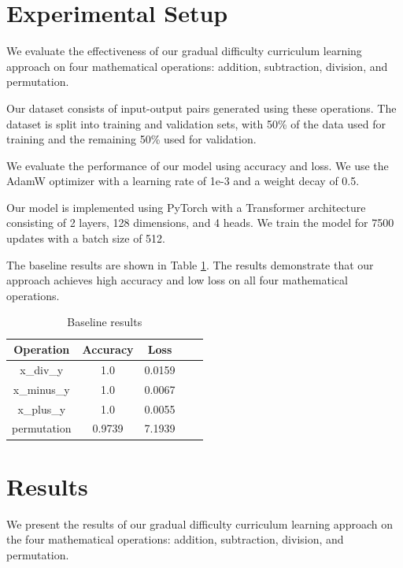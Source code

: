 \documentclass{article} %
\begin{document}
\section{Experimental Setup}
\label{sec:experimental}

We evaluate the effectiveness of our gradual difficulty curriculum learning approach on four mathematical operations: addition, subtraction, division, and permutation.

Our dataset consists of input-output pairs generated using these operations. The dataset is split into training and validation sets, with 50\% of the data used for training and the remaining 50\% used for validation.

We evaluate the performance of our model using accuracy and loss. We use the AdamW optimizer \citep{loshchilov2017adamw} with a learning rate of 1e-3 and a weight decay of 0.5.

Our model is implemented using PyTorch \citep{paszke2019pytorch} with a Transformer architecture \citep{vaswani2017attention} consisting of 2 layers, 128 dimensions, and 4 heads. We train the model for 7500 updates with a batch size of 512.

The baseline results are shown in Table \ref{tab:baseline_results}. The results demonstrate that our approach achieves high accuracy and low loss on all four mathematical operations.

\begin{table}[h]
    \centering
    \begin{tabular}{|c|c|c|c|c|}
        \hline
        Operation & Accuracy & Loss \\
        \hline
        x\_div\_y & 1.0 & 0.0159 \\
        x\_minus\_y & 1.0 & 0.0067 \\
        x\_plus\_y & 1.0 & 0.0055 \\
        permutation & 0.9739 & 7.1939 \\
        \hline
    \end{tabular}
    \caption{Baseline results}
    \label{tab:baseline_results}
\end{table}

\section{Results}
\label{sec:results}

We present the results of our gradual difficulty curriculum learning approach on the four mathematical operations: addition, subtraction, division, and permutation. 
\end{document}
